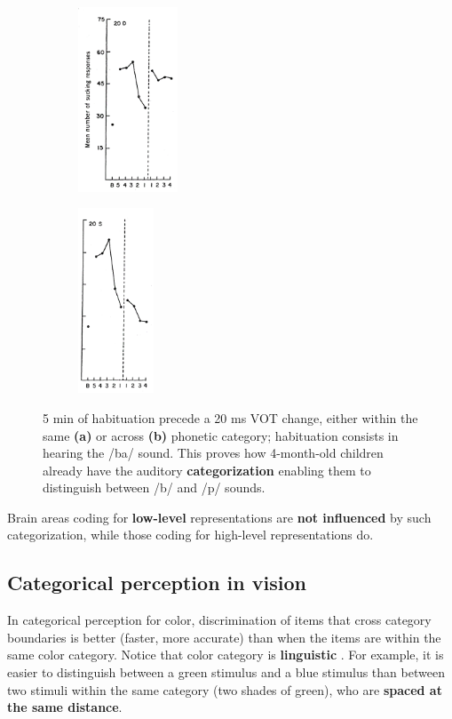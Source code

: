 \begin{figure}
  \begin{subfigure}{.22\textwidth}
  \centering
    \includegraphics[height=5.5cm]{images/eimas_a.png}
    \caption{}
  \end{subfigure}%
  \begin{subfigure}{.2\textwidth}
  \centering
    \includegraphics[height=5.5cm]{images/eimas_b.png}
    \caption{}
  \end{subfigure}
  \caption{5 min of habituation precede a 20 ms VOT change, either within the same \textbf{(a)} or across \textbf{(b)} phonetic category; habituation consists in hearing the /ba/ sound. This proves how 4-month-old children already have the auditory \textbf{categorization} enabling them to distinguish between /b/ and /p/ sounds.}
    \label{fig:eimas}
\end{figure}

Brain areas coding for \textbf{low-level} representations are \textbf{not influenced} by such categorization, while those coding for high-level representations do.

\subsection{Categorical perception in vision}
In categorical perception for color, discrimination of items that cross category boundaries is better (faster, more accurate) than when the items are within the same color category. Notice that color category is \textbf{linguistic} \notet.
For example, it is easier to distinguish between a green stimulus and a blue stimulus than between two stimuli within the same category (two shades of green), who are \textbf{spaced at the same distance}.

